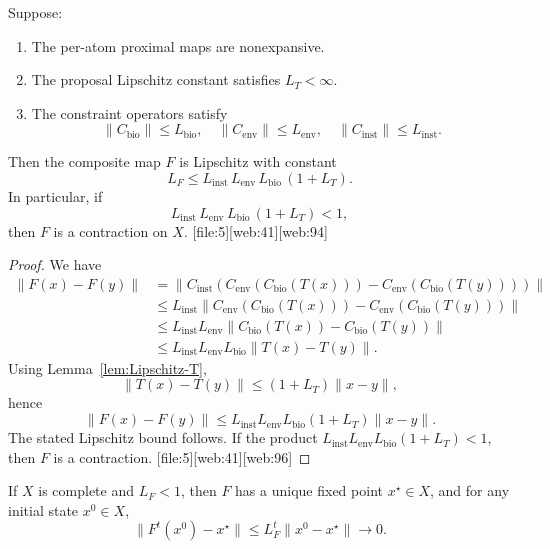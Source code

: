 \documentclass[11pt]{article}
\begin{document}
\begin{theorem}
Suppose:
\begin{enumerate}[label=(\roman*), leftmargin=*]
  \item The per-atom proximal maps are nonexpansive.
  \item The proposal Lipschitz constant satisfies \(L_T < \infty\).
  \item The constraint operators satisfy
  \[
    \|C_{\text{bio}}\|\leq L_{\text{bio}},\quad
    \|C_{\text{env}}\|\leq L_{\text{env}},\quad
    \|C_{\text{inst}}\|\leq L_{\text{inst}}.
  \]
\end{enumerate}
Then the composite map \(F\) is Lipschitz with constant
\[
  L_F \leq L_{\text{inst}}\,L_{\text{env}}\,L_{\text{bio}}\,(1 + L_T).
\]
In particular, if
\[
  L_{\text{inst}}\,L_{\text{env}}\,L_{\text{bio}}\,(1 + L_T) < 1,
\]
then \(F\) is a contraction on \(X\). [file:5][web:41][web:94]
\label{thm:F-contraction}
\end{theorem}

\begin{proof}
We have
\begin{align*}
  \|F(x) - F(y)\|
  &= \|C_{\text{inst}}(C_{\text{env}}(C_{\text{bio}}(T(x))) - C_{\text{env}}(C_{\text{bio}}(T(y))) )\| \\
  &\leq L_{\text{inst}} \|C_{\text{env}}(C_{\text{bio}}(T(x))) - C_{\text{env}}(C_{\text{bio}}(T(y)))\| \\
  &\leq L_{\text{inst}} L_{\text{env}} \|C_{\text{bio}}(T(x)) - C_{\text{bio}}(T(y))\| \\
  &\leq L_{\text{inst}} L_{\text{env}} L_{\text{bio}} \|T(x) - T(y)\|.
\end{align*}
Using Lemma~\ref{lem:Lipschitz-T},
\[
  \|T(x) - T(y)\| \leq (1+L_T)\|x-y\|,
\]
hence
\[
  \|F(x) - F(y)\| \leq
  L_{\text{inst}} L_{\text{env}} L_{\text{bio}} (1+L_T)\|x-y\|.
\]
The stated Lipschitz bound follows. If the product \(L_{\text{inst}} L_{\text{env}} L_{\text{bio}} (1+L_T) < 1\), then \(F\) is a contraction. [file:5][web:41][web:96]
\end{proof}

\begin{corollary}
If \(X\) is complete and \(L_F<1\), then \(F\) has a unique fixed point \(x^\star\in X\), and for any initial state \(x^0\in X\),
\[
  \|F^t(x^0) - x^\star\| \leq L_F^t \|x^0 - x^\star\|\to 0.
\]
\label{cor:Banach-F}
\end{corollary}
\end{document}
